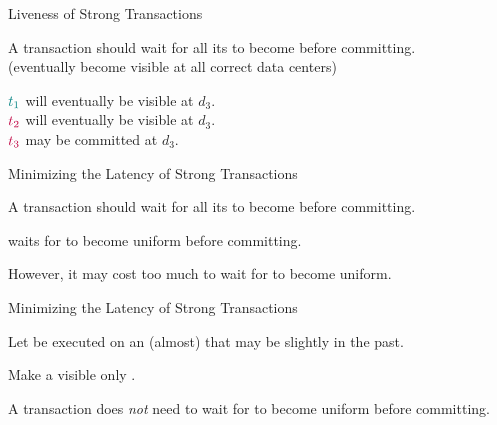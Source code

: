 \begin{frame}{Liveness of Strong Transactions}
  \begin{center}
    A  transaction should wait for all its
     to become  before committing. \\[3pt]
    {\footnotesize (eventually become visible at all correct data centers)}

    \vspace{0.30cm}

    \pause
    $\textcolor{teal}{t_{1}}$ will eventually be visible at $d_{3}$. \\[3pt]
    \pause
    $\textcolor{purple}{t_{2}}$ will eventually be visible at $d_{3}$. \\[3pt]
    \pause
    $\textcolor{purple}{t_{3}}$ may be committed at $d_{3}$. \\[3pt]
  \end{center}
\end{frame}

\begin{frame}{Minimizing the Latency of Strong Transactions}
  \begin{center}
    A  transaction should wait for all its
     to become  before committing.

    \vspace{0.30cm}

    \pause
    \vspace{0.20cm}
     waits for  
    to become uniform before committing.

    \pause
    \vspace{0.50cm}
    However, it may cost too much to wait for  
    to become uniform.
  \end{center}
\end{frame}

\begin{frame}{Minimizing the Latency of Strong Transactions}
  \begin{center}
    Let  be executed on an (almost)
     that may be slightly in the past.

    \vspace{0.50cm}

    \pause
    \vspace{0.30cm}
    Make a   visible
    only .

    \pause
    \vspace{0.30cm}
    A  transaction does \emph{not}
    need to wait for  
    to become uniform before committing.
  \end{center}
\end{frame}
